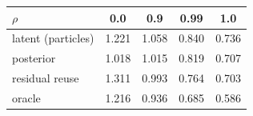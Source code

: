 \begin{tabular}{lcccc}
\toprule
$\rho$ & 0.0 & 0.9 & 0.99 & 1.0 \\
\midrule
latent (particles) & 1.221 & 1.058 & 0.840 & 0.736 \\
posterior & 1.018 & 1.015 & 0.819 & 0.707 \\
residual reuse & 1.311 & 0.993 & 0.764 & 0.703 \\
oracle & 1.216 & 0.936 & 0.685 & 0.586 \\
\bottomrule
\end{tabular}
